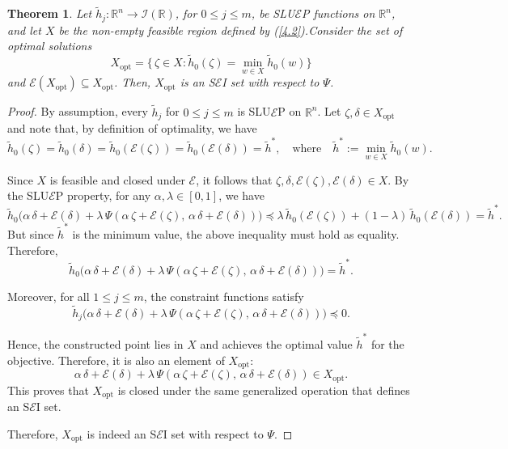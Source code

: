 \documentclass[10pt,a4paper]{amsart}
\newtheorem{theorem}{Theorem}
\begin{document}
\begin{theorem}
Let $\tilde{h}_{j}: \mathbb{R}^{n} \rightarrow \mathcal{I}(\mathbb{R})$, for $0 \leq j \leq m$, be SLU$\mathcal{E}$P functions on $\mathbb{R}^{n}$, and let $X$ be the non-empty feasible region defined by \emph{(\ref{4.2})}.Consider the set of optimal solutions 
\[
X_{\text{opt}} = \big\{\, \zeta \in X : \tilde{h}_{0}(\zeta) = \min_{w \in X} \tilde{h}_{0}(w) \big\}
\] and $\mathcal{E}(X_{\text{opt}})\subseteq X_{\text{opt}}$. Then, $X_{\text{opt}}$
is an S$\mathcal{E}$I set with respect to $\Psi$.
\end{theorem}

\begin{proof}
By assumption, every $\tilde{h}_{j}$ for $0 \leq j \leq m$ is SLU$\mathcal{E}$P on $\mathbb{R}^{n}$. Let $\mathit{\zeta}, \mathit{\delta} \in X_{\text{opt}}$ and note that, by definition of optimality, we have
\[
\tilde{h}_{0}(\mathit{\zeta}) = \tilde{h}_{0}(\mathit{\delta}) = \tilde{h}_{0}(\mathcal{E}(\mathit{\zeta})) = \tilde{h}_{0}(\mathcal{E}(\mathit{\delta})) = \tilde{h}^{*},
\quad \text{where} \quad 
\tilde{h}^{*} := \min_{w \in X} \tilde{h}_{0}(w).
\]

Since $X$ is feasible and closed under $\mathcal{E}$, it follows that
$\mathit{\zeta}, \mathit{\delta}, \mathcal{E}(\mathit{\zeta}), \mathcal{E}(\mathit{\delta}) \in X$. By the SLU$\mathcal{E}$P property, for any $\alpha, \lambda \in [0,1]$, we have
\[
\tilde{h}_{0}\big( 
\alpha\, \mathit{\delta} + \mathcal{E}(\mathit{\delta})
+ \lambda\, \Psi(
\alpha\, \mathit{\zeta} + \mathcal{E}(\mathit{\zeta}),
\, \alpha\, \mathit{\delta} + \mathcal{E}(\mathit{\delta})
)
\big)
\preceq
\lambda\, \tilde{h}_{0}(\mathcal{E}(\mathit{\zeta})) + (1-\lambda)\, \tilde{h}_{0}(\mathcal{E}(\mathit{\delta})) 
= \tilde{h}^{*}.
\]
But since $\tilde{h}^{*}$ is the minimum value, the above inequality must hold as equality. Therefore,
\[
\tilde{h}_{0}\big(
\alpha\, \mathit{\delta} + \mathcal{E}(\mathit{\delta}) 
+ \lambda\, \Psi(
\alpha\, \mathit{\zeta} + \mathcal{E}(\mathit{\zeta}),
\, \alpha\, \mathit{\delta} + \mathcal{E}(\mathit{\delta})
)
\big) = \tilde{h}^{*}.
\]

Moreover, for all $1 \leq j \leq m$, the constraint functions satisfy
\[
\tilde{h}_{j}\big(
\alpha\, \mathit{\delta} + \mathcal{E}(\mathit{\delta})
+ \lambda\, \Psi(
\alpha\, \mathit{\zeta} + \mathcal{E}(\mathit{\zeta}),
\, \alpha\, \mathit{\delta} + \mathcal{E}(\mathit{\delta})
)
\big) \preceq 0.
\]

Hence, the constructed point lies in $X$ and achieves the optimal value $\tilde{h}^{*}$ for the objective. Therefore, it is also an element of $X_{\text{opt}}$:
\[
\alpha\, \mathit{\delta} + \mathcal{E}(\mathit{\delta})
+ \lambda\, \Psi(
\alpha\, \mathit{\zeta} + \mathcal{E}(\mathit{\zeta}),
\, \alpha\, \mathit{\delta} + \mathcal{E}(\mathit{\delta})
) \in X_{\text{opt}}.
\]
This proves that $X_{\text{opt}}$ is closed under the same generalized operation that defines an S$\mathcal{E}$I set.

Therefore, $X_{\text{opt}}$ is indeed an S$\mathcal{E}$I set with respect to $\Psi$.
\end{proof} 
\end{document}
